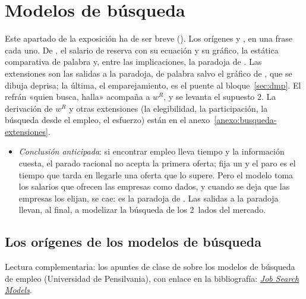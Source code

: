 \documentclass[11pt]{article}
\begin{document}
\section{Modelos de búsqueda}\label{sec:busqueda}

\begin{notaopositor}
Este apartado de la exposición ha de ser breve (). Los orígenes y , en una frase cada uno. De , el salario de reserva con su ecuación y su gráfico, la estática comparativa de palabra y, entre las implicaciones, la paradoja de . Las extensiones son las salidas a la paradoja, de palabra salvo el gráfico de , que se dibuja deprisa; la última, el emparejamiento, es el puente al bloque~\ref{sec:dmp}. El refrán «quien busca, halla» acompaña a $w^R$, y se levanta el supuesto 2. La derivación de $w^R$ y otras extensiones (la elegibilidad, la participación, la búsqueda desde el empleo, el esfuerzo) están en el anexo~\ref{anexo:busqueda-extensiones}.
\end{notaopositor}

\begin{itemize}
\item \emph{Conclusión anticipada}: si encontrar empleo lleva tiempo y la información cuesta, el parado racional no acepta la primera oferta; fija un  y el paro es el tiempo que tarda en llegarle una oferta que lo supere. Pero el modelo toma los salarios que ofrecen las empresas como dados, y cuando se deja que las empresas los elijan, se cae: es la paradoja de . Las salidas a la paradoja llevan, al final, a modelizar la búsqueda de los 2~lados del mercado.
\end{itemize}

\subsection{Los orígenes de los modelos de búsqueda}\label{sec:busqueda-origenes}

\begin{anotaciones}
Lectura complementaria: los apuntes de clase de \textcite{FernandezVillaverde2021JobSearch} sobre los modelos de búsqueda de empleo (Universidad de Pensilvania), con enlace en la bibliografía: \href{https://www.sas.upenn.edu/~jesusfv/lecture7_jobsearch.pdf}{\emph{Job Search Models}}.
\end{anotaciones}
\end{document}
